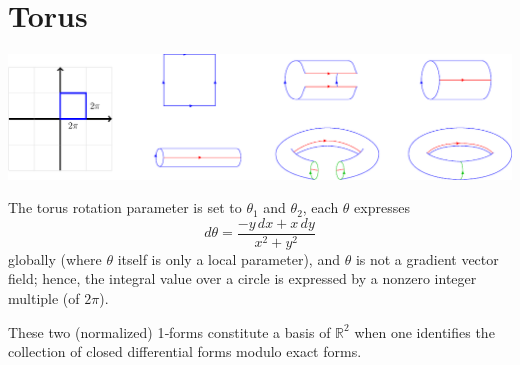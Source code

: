 \documentclass[11pt,openany]{article}
\renewcommand{\Re}{\operatorname*{Re}}
\renewcommand{\Im}{\operatorname*{Im}}
\begin{document}
%	
%	
%	
%	
%	
%	
%	

\newpage
\section{Torus}
\begin{center}
\includegraphics[scale=.85]{../tikz/grad-math-tikz-algebra/torus.pdf}
\end{center}
\begin{note}
The torus rotation parameter is set to \(\theta_1\) and \(\theta_2\), each \(\theta\) expresses \[
d\theta = \frac{-y\,dx+x\,dy}{x^2+y^2}
\]
globally (where \(\theta\) itself is only a local parameter), and \(\theta\) is not a gradient vector field; hence, the integral value over a circle is expressed by a nonzero integer multiple (of \(2\pi\)). \par
These two (normalized) 1‑forms constitute a basis of \(\mathbb{R}^2\) when one identifies the collection of closed differential forms modulo exact forms.
\end{note}
\end{document}
